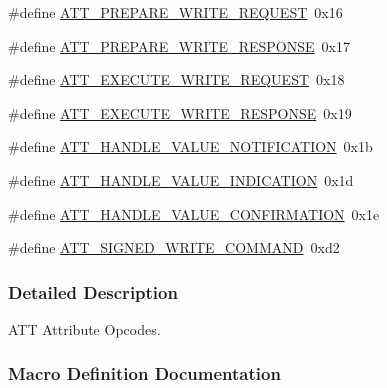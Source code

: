 \begin{DoxyCompactItemize}
\item 
\#define \hyperlink{group___b_l_e___a_t_t___o_p_c_o_d_e_s_ga458644f9db90f9b1504b0acef148db00}{A\+T\+T\+\_\+\+P\+R\+E\+P\+A\+R\+E\+\_\+\+W\+R\+I\+T\+E\+\_\+\+R\+E\+Q\+U\+E\+ST}~0x16
\item 
\#define \hyperlink{group___b_l_e___a_t_t___o_p_c_o_d_e_s_ga9474381b4b4e50f9edbccaa9f173abec}{A\+T\+T\+\_\+\+P\+R\+E\+P\+A\+R\+E\+\_\+\+W\+R\+I\+T\+E\+\_\+\+R\+E\+S\+P\+O\+N\+SE}~0x17
\item 
\#define \hyperlink{group___b_l_e___a_t_t___o_p_c_o_d_e_s_ga35128bfad7191479a5c68f8141ab5a69}{A\+T\+T\+\_\+\+E\+X\+E\+C\+U\+T\+E\+\_\+\+W\+R\+I\+T\+E\+\_\+\+R\+E\+Q\+U\+E\+ST}~0x18
\item 
\#define \hyperlink{group___b_l_e___a_t_t___o_p_c_o_d_e_s_gaed9fb4eeaf4e812f4563800e6cf511ea}{A\+T\+T\+\_\+\+E\+X\+E\+C\+U\+T\+E\+\_\+\+W\+R\+I\+T\+E\+\_\+\+R\+E\+S\+P\+O\+N\+SE}~0x19
\item 
\#define \hyperlink{group___b_l_e___a_t_t___o_p_c_o_d_e_s_ga7d6457c17b53ec6363789b7d4c4577c1}{A\+T\+T\+\_\+\+H\+A\+N\+D\+L\+E\+\_\+\+V\+A\+L\+U\+E\+\_\+\+N\+O\+T\+I\+F\+I\+C\+A\+T\+I\+ON}~0x1b
\item 
\#define \hyperlink{group___b_l_e___a_t_t___o_p_c_o_d_e_s_ga425489dab71fc5f944afd3d4fcc78638}{A\+T\+T\+\_\+\+H\+A\+N\+D\+L\+E\+\_\+\+V\+A\+L\+U\+E\+\_\+\+I\+N\+D\+I\+C\+A\+T\+I\+ON}~0x1d
\item 
\#define \hyperlink{group___b_l_e___a_t_t___o_p_c_o_d_e_s_ga0815898a64bd4f478e4ad2637e209473}{A\+T\+T\+\_\+\+H\+A\+N\+D\+L\+E\+\_\+\+V\+A\+L\+U\+E\+\_\+\+C\+O\+N\+F\+I\+R\+M\+A\+T\+I\+ON}~0x1e
\item 
\#define \hyperlink{group___b_l_e___a_t_t___o_p_c_o_d_e_s_ga5308f7c16edd95d4c940c907166cb1e0}{A\+T\+T\+\_\+\+S\+I\+G\+N\+E\+D\+\_\+\+W\+R\+I\+T\+E\+\_\+\+C\+O\+M\+M\+A\+ND}~0xd2
\end{DoxyCompactItemize}


\subsubsection{Detailed Description}
A\+TT Attribute Opcodes. 



\subsubsection{Macro Definition Documentation}

